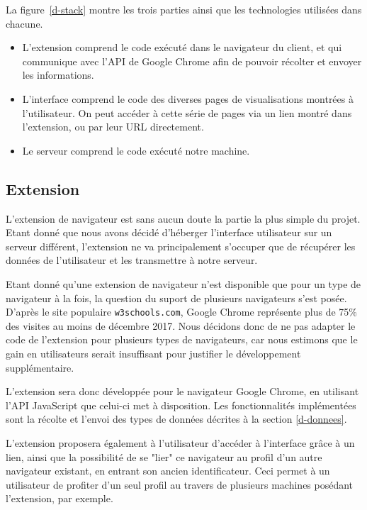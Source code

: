 		La figure~\ref{d-stack} montre les trois parties ainsi que les technologies utilisées dans chacune.

		\begin{itemize}
			\item L'extension comprend le code exécuté dans le navigateur du client, et qui communique avec l'API de Google Chrome afin de pouvoir récolter et envoyer les informations.
			\item L'interface comprend le code des diverses pages de visualisations montrées à l'utilisateur. On peut accéder à cette série de pages via un lien montré dans l'extension, ou par leur URL directement.
			\item Le serveur comprend le code exécuté notre machine.
		\end{itemize}

	\subsection{Extension}

		L'extension de navigateur est sans aucun doute la partie la plus simple du projet. Etant donné que nous avons décidé d'héberger l'interface utilisateur sur un serveur différent, l'extension ne va principalement s'occuper que de récupérer les données de l'utilisateur et les transmettre à notre serveur.

		Etant donné qu'une extension de navigateur n'est disponible que pour un type de navigateur à la fois, la question du suport de plusieurs navigateurs s'est posée. D'après le site populaire \texttt{w3schools.com}\cite{browser-stats}, Google Chrome représente plus de 75\% des visites au moins de décembre 2017. Nous décidons donc de ne pas adapter le code de l'extension pour plusieurs types de navigateurs, car nous estimons que le gain en utilisateurs serait insuffisant pour justifier le développement supplémentaire.

		L'extension sera donc développée pour le navigateur Google Chrome, en utilisant l'API JavaScript que celui-ci met à disposition. Les fonctionnalités implémentées sont la récolte et l'envoi des types de données décrites à la section \ref{d-donnees}.

		L'extension proposera également à l'utilisateur d'accéder à l'interface grâce à un lien, ainsi que la possibilité de se "lier" ce navigateur au profil d'un autre navigateur existant, en entrant son ancien identificateur. Ceci permet à un utilisateur de profiter d'un seul profil au travers de plusieurs machines posédant l'extension, par exemple. 

